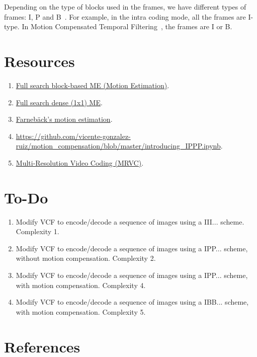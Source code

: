 Depending on the type of blocks used in the frames, we have different
types of frames: I, P and B~\cite{vruiz__MC}. For example, in the
intra coding mode, all the frames are I-type. In Motion Compensated
Temporal Filtering~\cite{vruiz__MCTF}, the frames are I or B.

\section{Resources}
\begin{enumerate}
\item \href{https://github.com/vicente-gonzalez-ruiz/motion_estimation/blob/main/src/motion_estimation/full_search_block_ME.ipynb}{Full search block-based ME (Motion Estimation)}.
\item \href{https://github.com/vicente-gonzalez-ruiz/motion_estimation/blob/main/src/motion_estimation/full_search_dense_ME.ipynb}{Full search dense (1x1) ME}.
\item \href{https://github.com/vicente-gonzalez-ruiz/motion_estimation/blob/main/src/motion_estimation/farneback_ME.ipynb}{Farnebäck's motion estimation}.
\item \href{https://github.com/vicente-gonzalez-ruiz/motion_compensation/blob/master/introducing_IPPP.ipynb}{https://github.com/vicente-gonzalez-ruiz/motion_compensation/blob/master/introducing_IPPP.ipynb}.
\item \href{https://github.com/Sistemas-Multimedia/MRVC}{Multi-Resolution Video Coding (MRVC)}.
\end{enumerate}

\section{To-Do}

\begin{enumerate}
\item Modify VCF to encode/decode a sequence of images using a
  III... scheme. Complexity 1.
\item Modify VCF to encode/decode a sequence of images using a
  IPP... scheme, without motion compensation. Complexity 2.
\item Modify VCF to encode/decode a sequence of images using a
  IPP... scheme, with motion compensation. Complexity 4.
\item Modify VCF to encode/decode a sequence of images using a
  IBB... scheme, with motion compensation. Complexity 5.
\end{enumerate}

  
\section{References}

\renewcommand{\addcontentsline}[3]{}%


